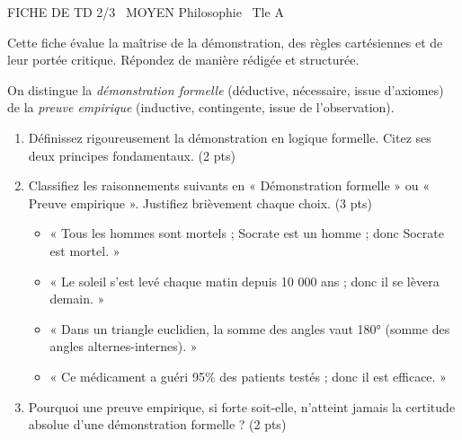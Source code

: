 \documentclass[11pt]{article}
\begin{document}
\begin{tcolorbox}[enhanced,colback=popink,colframe=popink,arc=10pt,boxrule=0pt,left=12pt,right=12pt,top=9pt,bottom=9pt]
{\color{white}\popxbold\small FICHE DE TD 2/3 \textbullet\ MOYEN \hfill Philosophie \textbullet\ Tle A\par}
\end{tcolorbox}
\vspace{4pt}
\noindent Cette fiche évalue la maîtrise de la démonstration, des règles cartésiennes et de leur portée critique. Répondez de manière rédigée et structurée.

\begin{exercice}
On distingue la \textit{démonstration formelle} (déductive, nécessaire, issue d'axiomes) de la \textit{preuve empirique} (inductive, contingente, issue de l'observation).
\begin{enumerate}
    \item Définissez rigoureusement la démonstration en logique formelle. Citez ses deux principes fondamentaux. (2 pts)
    \item Classifiez les raisonnements suivants en « Démonstration formelle » ou « Preuve empirique ». Justifiez brièvement chaque choix. (3 pts)
    \begin{itemize}
        \item « Tous les hommes sont mortels ; Socrate est un homme ; donc Socrate est mortel. »
        \item « Le soleil s'est levé chaque matin depuis 10 000 ans ; donc il se lèvera demain. »
        \item « Dans un triangle euclidien, la somme des angles vaut 180° (somme des angles alternes-internes). »
        \item « Ce médicament a guéri 95\% des patients testés ; donc il est efficace. »
    \end{itemize}
    \item Pourquoi une preuve empirique, si forte soit-elle, n'atteint jamais la certitude absolue d'une démonstration formelle ? (2 pts)
\end{enumerate}
\end{exercice}
\end{document}
